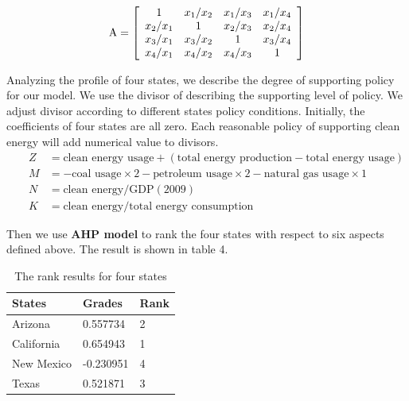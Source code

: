 \documentclass{mcmthesis}
\begin{document}
\begin{equation}\label{21}
\rm {A}=
\left[ \begin{array}{cccc}
   1 & x_1/x_2 & x_1/x_3 & x_1/x_4 \\
   x_2/x_1 & 1 & x_2/x_3 & x_2/x_4 \\
   x_3/x_1 & x_3/x_2 & 1 & x_3/x_4 \\
   x_4/x_1 & x_4/x_2 & x_4/x_3 & 1
  \end{array}
  \right]
\end{equation}

Analyzing the profile of four states, we describe the degree of supporting policy for our model. We use the divisor of describing the supporting level of policy. We adjust divisor according to different states policy conditions. Initially, the coefficients of four states are all zero. Each reasonable policy of supporting clean energy will add numerical value to divisors.
\begin{align}
&& Z&=\text{clean energy usage}+(\text{total energy production}- \text{total energy usage}) \\
&& M&=-\text{coal usage}\times 2-\text{petroleum usage}\times 2-\text{natural gas usage}\times 1 \\
&& N&=\text{clean energy}/\text{GDP}(2009) \\
&& K&=\text{clean energy}/\text{total energy consumption}
\end{align}

Then we use {\bf{AHP model}} to rank the four states with respect to six aspects defined above\cite{Al2001Application}. The result is shown in table 4.

\begin{table}[!ht]
\caption{The rank results for four states}
 \renewcommand\arraystretch{1.5}
 \setlength{\abovecaptionskip}{0pt}%
\setlength{\belowcaptionskip}{10pt}%
\begin{center}
\begin{tabular}{p{}<{\centering} p{}<{\centering}
p{}<{\centering} }
\toprule[1.5pt]
States & Grades & Rank  \\
 \midrule

Arizona & 0.557734 & 2 \\
California & 0.654943 & 1 \\
New Mexico & -0.230951 & 4 \\
Texas & 0.521871 & 3 \\
 \bottomrule[1.5pt]
 \end{tabular}
 \end{center} 
 \end{table}
\end{document}
